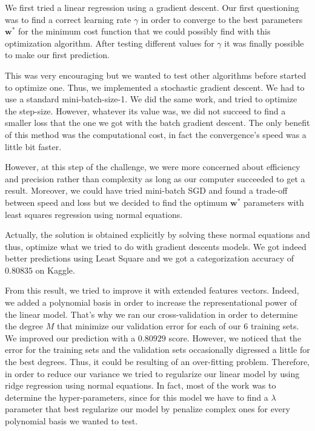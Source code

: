 \documentclass[10pt,conference,compsocconf]{IEEEtran}
\begin{document}
We first tried a linear regression using a gradient descent. Our first questioning was to find a correct learning rate $\gamma$ in order to converge to the best parameters $\mathbf{w^*}$ for the minimum cost function that we could possibly find with this optimization algorithm. After testing different values for $\gamma$ it was finally possible to make our first prediction. 

This was very encouraging but we wanted to test other algorithms before started to optimize one. Thus, we implemented a stochastic gradient descent. We had to use a standard mini-batch-size-1. We did the same work, and tried to optimize the step-size. However, whatever its value was, we did not succeed to find a smaller loss that the one we got with the batch gradient descent. The only benefit of this method was the computational cost, in fact the convergence's speed was a little bit faster. 

However, at this step of the challenge, we were more concerned about efficiency and precision rather than complexity as long as our computer succeeded to get a result. Moreover, we could have tried mini-batch SGD and found a trade-off between speed and loss but we decided to find the optimum $\mathbf{w^*}$ parameters with least squares regression using normal equations. 

Actually, the solution is obtained explicitly by solving these normal equations and thus, optimize what we tried to do with gradient descents models. We got indeed better predictions using Least Square and we got a categorization accuracy of $0.80835$ on Kaggle. 

From this result, we tried to improve it with extended features vectors. Indeed, we added a polynomial basis in order to increase the representational power of the linear model. That's why we ran our cross-validation in order to determine the degree $M$ that minimize our validation error for each of our $6$ training sets. We improved our prediction with a $0.80929$ score. However, we noticed that the error for the training sets and the validation sets occasionally digressed a little for the best degrees. Thus, it could be resulting of an over-fitting problem. Therefore, in order to reduce our variance we tried to regularize our linear model by using ridge regression using normal equations. In fact, most of the work was to determine the hyper-parameters, since for this model we have to find a $\lambda$ parameter that best regularize our model by penalize complex ones for every polynomial basis we wanted to test. 
\end{document}
